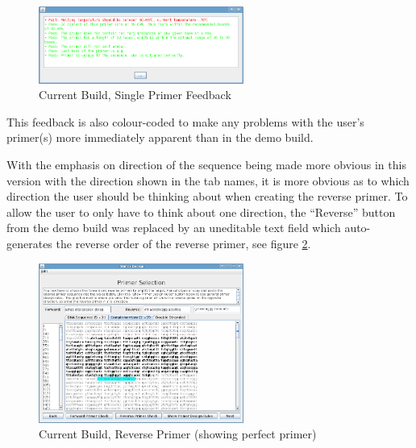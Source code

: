 \begin{figure}[h]
  \begin{center}
    \includegraphics[width=0.6\textwidth]{./images/currentBuild/primerEvalRed.png}
    \caption{
      \label{fig:currentBuild:primerEvalRed}
      Current Build, Single Primer Feedback
    }
  \end{center}
\end{figure}

This feedback is also colour-coded to make any problems with the
user's primer(s) more immediately apparent than in the demo build.

With the emphasis on direction of the sequence being made more obvious
in this version with the direction shown in the tab names, it is more
obvious as to which direction the user should be thinking about when
creating the reverse primer.
To allow the user to only have to think about one direction, the
``Reverse'' button from the demo build was replaced by an uneditable
text field which auto-generates the reverse order of the reverse
primer, see figure \ref{fig:currentBuild:reversePrimerPerfect}.

\begin{figure}[h]
  \begin{center}
    \includegraphics[width=0.6\textwidth]{./images/currentBuild/reversePrimerPerfect.png}
    \caption{
      \label{fig:currentBuild:reversePrimerPerfect}
      Current Build, Reverse Primer (showing perfect primer)
    }
  \end{center}
\end{figure}

